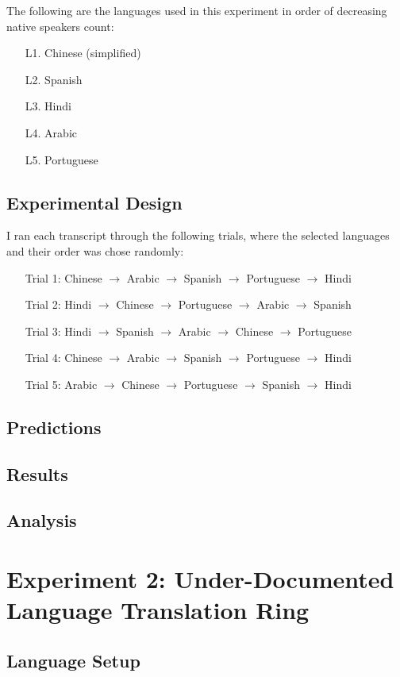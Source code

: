 \documentclass{article}
\begin{document}
\vspace{1em} \noindent
The following are the languages used in this experiment in order of decreasing native speakers count:
\begin{enumerate}
  \item[L1.] Chinese (simplified)
  \item[L2.] Spanish
  \item[L3.] Hindi
  \item[L4.] Arabic
  \item[L5.] Portuguese
\end{enumerate}

\subsection{Experimental Design}


I ran each transcript through the following trials, where the selected languages and their order was chose randomly:
\begin{enumerate}
  \item[] Trial 1: Chinese $\rightarrow$ Arabic $\rightarrow$ Spanish $\rightarrow$ Portuguese $\rightarrow$ Hindi
  \item[] Trial 2: Hindi $\rightarrow$ Chinese $\rightarrow$ Portuguese $\rightarrow$ Arabic $\rightarrow$ Spanish
  \item[] Trial 3: Hindi $\rightarrow$ Spanish $\rightarrow$ Arabic $\rightarrow$ Chinese $\rightarrow$ Portuguese
  \item[] Trial 4: Chinese $\rightarrow$ Arabic $\rightarrow$ Spanish $\rightarrow$ Portuguese $\rightarrow$ Hindi
  \item[] Trial 5: Arabic $\rightarrow$ Chinese $\rightarrow$ Portuguese $\rightarrow$ Spanish $\rightarrow$ Hindi
\end{enumerate}


\subsection{Predictions}\subsection{Results}\subsection{Analysis}\section{Experiment 2: Under-Documented Language Translation Ring}\subsection{Language Setup}
\end{document}
